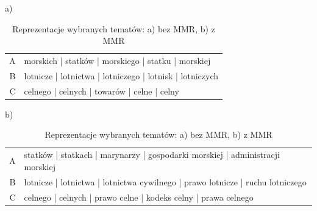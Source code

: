 	\begin{table}[htb]
		\caption{Reprezentacje wybranych tematów: a) bez MMR, b) z MMR}\label{tab:mmr} %
		a) %

		\begin{tabularx}{\textwidth}{rl}
			A	&	morskich | statków | morskiego | statku | morskiej	\\ 
			B	&	lotnicze | lotnictwa | lotniczego | lotnisk | lotniczych	\\ 
			C	&	celnego | celnych | towarów | celne | celny	\\
		\end{tabularx}
		b) %

		\begin{tabularx}{\textwidth}{rl}
			A	&	statków | statkach | marynarzy | gospodarki morskiej | administracji morskiej	\\ 
			B	&	lotnicze | lotnictwa | lotnictwa cywilnego | prawo lotnicze | ruchu lotniczego \\ 
			C	&	celnego | celnych | prawo celne | kodeks celny | prawa celnego \\
		\end{tabularx}
	\end{table}